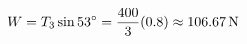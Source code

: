 \documentclass[preview]{standalone}
\begin{document}
\begin{align*}
\special{dvisvgm:raw <g id='unique000'>}W = T_3 \sin 53^{\circ} = \frac{400}{3}(0.8) \approx 106.67\,\mathrm{N}\special{dvisvgm:raw </g>}
\end{align*}
\end{document}

